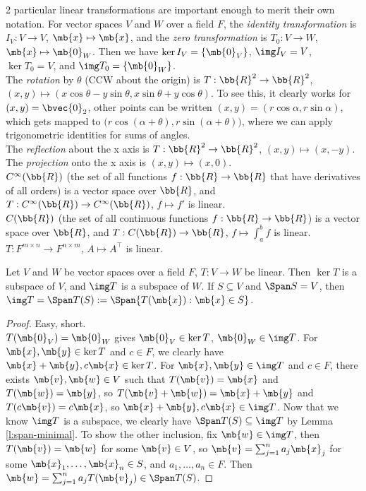 \begin{example}
2 particular linear transformations are important enough to merit their own notation. For vector spaces $V$ and $W$ over a field $F$, the \emph{identity transformation} is $I_V:V \to V$, $\mb{x}\mapsto \mb{x}$, and the \emph{zero transformation} is $T_0:V \to W$, $\mb{x}\mapsto \mb{0}_W$.
Then we have $\ker I_V= \{ \mb{0}_V \}$, $\img I_V=V$, $\ker T_0=V$, and $\img T_0= \{ \mb{0}_W \}$.\\
The \emph{rotation} by $\theta$ (CCW about the origin) is $T:\bb{R}^2 \to \bb{R}^2$, $(x,y) \mapsto (x \cos \theta-y \sin \theta, x \sin \theta+y \cos \theta)$.
To see this, it clearly works for $(x,y)= \bvec{0}_2$, other points can be written $(x,y)=(r \cos \alpha,r \sin \alpha)$, which gets mapped to $\big( r \cos( \alpha+ \theta),r \sin( \alpha+\theta) \big)$, where we can apply trigonometric identities for sums of angles.\\
The \emph{reflection} about the x axis is $T: \bb{R}^2 \to \bb{R}^2$, $(x,y) \mapsto (x,-y)$. The \emph{projection} onto the x axis is $(x,y) \mapsto (x,0)$.\\
$C^\infty ( \bb{R})$ (the set of all functions $f: \bb{R}\to \bb{R}$ that have derivatives of all orders) is a vector space over $\bb{R}$, and $T:C^\infty ( \bb{R}) \to C^\infty ( \bb{R})$, $f \mapsto f'$ is linear.\\
$C( \bb{R})$ (the set of all continuous functions $f: \bb{R}\to \bb{R}$) is a vector space over $\bb{R}$, and $T:C( \bb{R}) \to \bb{R}$, $f \mapsto \int_a^b f$ is linear.\\
$T:F^{m \times n}\to F^{n \times m}$, $A \mapsto A^\top$ is linear.
\end{example}
\begin{lem}\label{l:ker-img-linear}
Let $V$ and $W$ be vector spaces over a field $F$, $T:V \to W$ be linear. Then $\ker T$ is a subspace of $V$, and $\img T$ is a subspace of $W$. If $S \subseteq V$ and $\Span S=V$, then $\img T= \Span T(S):= \Span \{ T( \mb{x}): \mb{x}\in S \}$.
\end{lem}
\begin{proof}
Easy, short.\\
$T( \mb{0}_V)= \mb{0}_W$ gives $\mb{0}_V \in \ker T$, $\mb{0}_W \in \img T$. For $\mb{x}, \mb{y}\in \ker T$ and $c \in F$, we clearly have $\mb{x}+ \mb{y}, c \mb{x}\in \ker T$.
For $\mb{x}, \mb{y}\in \img T$ and $c \in F$, there exists $\mb{v}, \mb{w}\in V$ such that $T( \mb{v})= \mb{x}$ and $T( \mb{w})= \mb{y}$, so $T( \mb{v}+ \mb{w})= \mb{x}+ \mb{y}$ and $T(c \mb{v})=c \mb{x}$, so $\mb{x}+ \mb{y},c \mb{x}\in \img T$.
Now that we know $\img T$ is a subspace, we clearly have $\Span T(S) \subseteq \img T$ by Lemma \ref{l:span-minimal}. To show the other inclusion, fix $\mb{w}\in \img T$, then $T( \mb{v})= \mb{w}$ for some $\mb{v}\in V$, so $\mb{v}= \sum_{j=1}^na_j \mb{x}_j$ for some $\mb{x}_1, \ldots, \mb{x}_n \in S$, and $a_1, \ldots,a_n \in F$. Then $\mb{w}= \sum_{j=1}^na_jT( \mb{v}_j) \in \Span T(S)$.
\end{proof}
